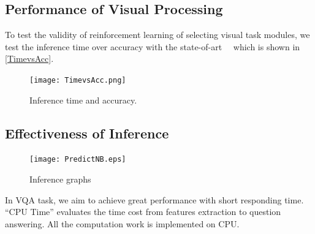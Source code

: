 \subsection{Performance of Visual Processing}

To test the validity of reinforcement learning of selecting visual task modules, we test the inference time over accuracy with the state-of-art~\cite{VQA}~\cite{Lu2016Hie} which is shown in \autoref{TimevsAcc}.

\begin{figure}[h]
\begin{center}
\texttt{[image: TimevsAcc.png]}
\end{center}
\caption{Inference time and accuracy.}
\label{fig:TimevsAcc}
\end{figure}


\subsection{Effectiveness of Inference} 
\begin{figure}[tb!]
\centering
\texttt{[image: PredictNB.eps]}
\vspace{-2ex}
\caption{Inference graphs}
\vspace{-2ex}
\label{fig:inferGraph}
\end{figure}


In VQA task, we aim to achieve great performance with short responding time. “CPU Time” evaluates the time cost from features extraction to question answering. All the computation work is implemented on CPU.

